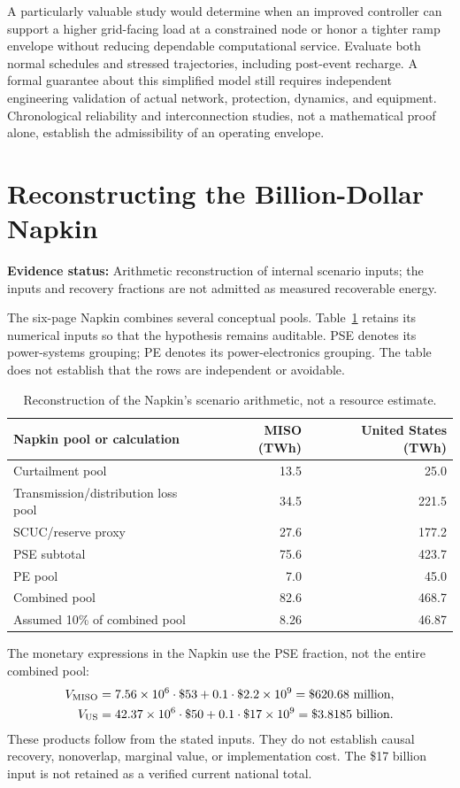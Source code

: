 \documentclass[11pt,letterpaper]{article}
\newcommand{\status}[1]{\textbf{Evidence status:} #1}
\begin{document}
A particularly valuable study would determine when an improved controller can support a higher grid-facing load at a constrained node or honor a tighter ramp envelope without reducing dependable computational service. Evaluate both normal schedules and stressed trajectories, including post-event recharge. A formal guarantee about this simplified model still requires independent engineering validation of actual network, protection, dynamics, and equipment. Chronological reliability and interconnection studies, not a mathematical proof alone, establish the admissibility of an operating envelope.

\section{Reconstructing the Billion-Dollar Napkin}
\label{sec:napkin}
\status{Arithmetic reconstruction of internal scenario inputs; the inputs and recovery fractions are not admitted as measured recoverable energy.}

The six-page Napkin combines several conceptual pools.\cite{napkin} Table~\ref{tab:napkin} retains its numerical inputs so that the hypothesis remains auditable. PSE denotes its power-systems grouping; PE denotes its power-electronics grouping. The table does not establish that the rows are independent or avoidable.

\begin{table}[ht]
\centering
\begin{tabular}{lrr}
\toprule Napkin pool or calculation & MISO (TWh) & United States (TWh)\\\midrule
Curtailment pool &13.5&25.0\\
Transmission/distribution loss pool &34.5&221.5\\
SCUC/reserve proxy &27.6&177.2\\
PSE subtotal &75.6&423.7\\
PE pool &7.0&45.0\\
Combined pool &82.6&468.7\\
Assumed 10\% of combined pool &8.26&46.87\\
\bottomrule
\end{tabular}
\caption{Reconstruction of the Napkin's scenario arithmetic, not a resource estimate.}\label{tab:napkin}
\end{table}

The monetary expressions in the Napkin use the PSE fraction, not the entire combined pool:
\begin{align*}
 V_{\rm MISO}&=7.56\times10^6\cdot\$53+0.1\cdot\$2.2\times10^9
                  =\$620.68\text{ million},\\
 V_{\rm US}&=42.37\times10^6\cdot\$50+0.1\cdot\$17\times10^9
                  =\$3.8185\text{ billion}.
\end{align*}
These products follow from the stated inputs. They do not establish causal recovery, nonoverlap, marginal value, or implementation cost. The \$17 billion input is not retained as a verified current national total.
\end{document}
